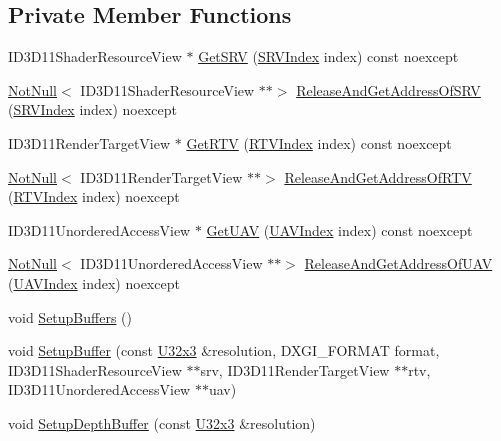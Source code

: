 \subsection*{Private Member Functions}
\begin{DoxyCompactItemize}
\item 
I\+D3\+D11\+Shader\+Resource\+View $\ast$ \hyperlink{classmage_1_1rendering_1_1_output_manager_a0dc5e124cbd78351b78cc7a3e7bff428}{Get\+S\+RV} (\hyperlink{classmage_1_1rendering_1_1_output_manager_a941f1b35a83ee0ce190494523ec0fe63}{S\+R\+V\+Index} index) const noexcept
\item 
\hyperlink{namespacemage_a8769f9d670d6b585ea306cb1062af94b}{Not\+Null}$<$ I\+D3\+D11\+Shader\+Resource\+View $\ast$$\ast$$>$ \hyperlink{classmage_1_1rendering_1_1_output_manager_afd13c25f8ab6cfafc5d694d3b64405f9}{Release\+And\+Get\+Address\+Of\+S\+RV} (\hyperlink{classmage_1_1rendering_1_1_output_manager_a941f1b35a83ee0ce190494523ec0fe63}{S\+R\+V\+Index} index) noexcept
\item 
I\+D3\+D11\+Render\+Target\+View $\ast$ \hyperlink{classmage_1_1rendering_1_1_output_manager_a2088241f582fd9b119f485c5e9a13b30}{Get\+R\+TV} (\hyperlink{classmage_1_1rendering_1_1_output_manager_af9caebb7e9cacf454d26b827a01e857c}{R\+T\+V\+Index} index) const noexcept
\item 
\hyperlink{namespacemage_a8769f9d670d6b585ea306cb1062af94b}{Not\+Null}$<$ I\+D3\+D11\+Render\+Target\+View $\ast$$\ast$$>$ \hyperlink{classmage_1_1rendering_1_1_output_manager_a997a7c48090b5b68e643f3158e9e9d7e}{Release\+And\+Get\+Address\+Of\+R\+TV} (\hyperlink{classmage_1_1rendering_1_1_output_manager_af9caebb7e9cacf454d26b827a01e857c}{R\+T\+V\+Index} index) noexcept
\item 
I\+D3\+D11\+Unordered\+Access\+View $\ast$ \hyperlink{classmage_1_1rendering_1_1_output_manager_a6eb1f3b756f121897fd869c355944e86}{Get\+U\+AV} (\hyperlink{classmage_1_1rendering_1_1_output_manager_a71b3797fef957312f92736f15b7ada3e}{U\+A\+V\+Index} index) const noexcept
\item 
\hyperlink{namespacemage_a8769f9d670d6b585ea306cb1062af94b}{Not\+Null}$<$ I\+D3\+D11\+Unordered\+Access\+View $\ast$$\ast$$>$ \hyperlink{classmage_1_1rendering_1_1_output_manager_a79ec82aadfe89ea1a9875567d9bbb74a}{Release\+And\+Get\+Address\+Of\+U\+AV} (\hyperlink{classmage_1_1rendering_1_1_output_manager_a71b3797fef957312f92736f15b7ada3e}{U\+A\+V\+Index} index) noexcept
\item 
void \hyperlink{classmage_1_1rendering_1_1_output_manager_a590172441d291329d1f5a9dbbdb71320}{Setup\+Buffers} ()
\item 
void \hyperlink{classmage_1_1rendering_1_1_output_manager_aca32d0307be3acfaa8f5a20fa24b6934}{Setup\+Buffer} (const \hyperlink{namespacemage_ab3633c193f686845fcf80ce95d18a20b}{U32x3} \&resolution, D\+X\+G\+I\+\_\+\+F\+O\+R\+M\+AT format, I\+D3\+D11\+Shader\+Resource\+View $\ast$$\ast$srv, I\+D3\+D11\+Render\+Target\+View $\ast$$\ast$rtv, I\+D3\+D11\+Unordered\+Access\+View $\ast$$\ast$uav)
\item 
void \hyperlink{classmage_1_1rendering_1_1_output_manager_a4cbd2dd771206b15d934657205475ae1}{Setup\+Depth\+Buffer} (const \hyperlink{namespacemage_ab3633c193f686845fcf80ce95d18a20b}{U32x3} \&resolution)
\end{DoxyCompactItemize}
